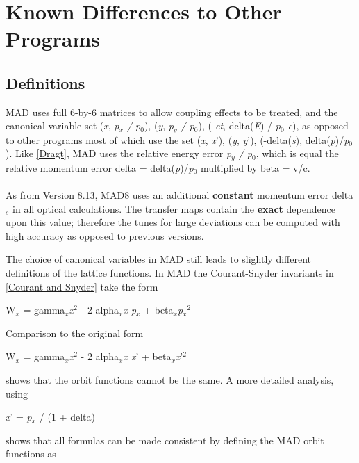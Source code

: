 
\chapter{Known Differences to Other Programs}

\section{Definitions} 

MAD uses full 6-by-6 matrices to allow coupling effects to be treated,
and the canonical variable set (\textit{x}, \textit{p$_x$ / p$_0$}),
(\textit{y}, \textit{p$_y$ / p$_0$}), (\textit{-ct}, delta(\textit{E}) /
\textit{p$_0$ c}), as opposed to other programs most of which use the
set (\textit{x}, \textit{x}'), (\textit{y}, \textit{y}'),
(-delta(\textit{s}), delta(\textit{p})/\textit{p$_0$}). Like
\href{bibliography.html#dragt}{[Dragt]}, MAD uses the relative energy
error \textit{p$_y$ / p$_0$}, which is equal the relative momentum error
delta = delta(\textit{p})/\textit{p$_0$} multiplied by beta = v/c.  
\\ \\ 
As from Version 8.13, MAD8 uses an additional \textbf{constant} momentum
error delta$_\textit{s}$ in all optical calculations. The transfer maps
contain the \textbf{exact} dependence upon this value; therefore the
tunes for large deviations can be computed with high accuracy as opposed
to previous versions.  

 
The choice of canonical variables in MAD still leads to slightly
different definitions of the lattice functions. In MAD the
Courant-Snyder invariants in \href{bibliography.html#courant}{[Courant
    and Snyder]} take the form  

W$_x$ = gamma$_\textit{x}$\textit{x}$^2$ - 2 alpha$_\textit{x}$\textit{x
  p$_x$} + beta$_\textit{x}$\textit{p$_x$}$^2$ 

Comparison to the original form 

 W$_x$ = gamma$_\textit{x}$\textit{x}$^2$ - 2
 alpha$_\textit{x}$\textit{x x}' + beta$_\textit{x}$\textit{x}'$^2$ 

shows that the orbit functions cannot be the same. A more detailed analysis, using 

\textit{x}' = \textit{p$_x$} / (1 + delta) 

shows that all formulas can be made consistent by defining the MAD orbit
functions as  
 
